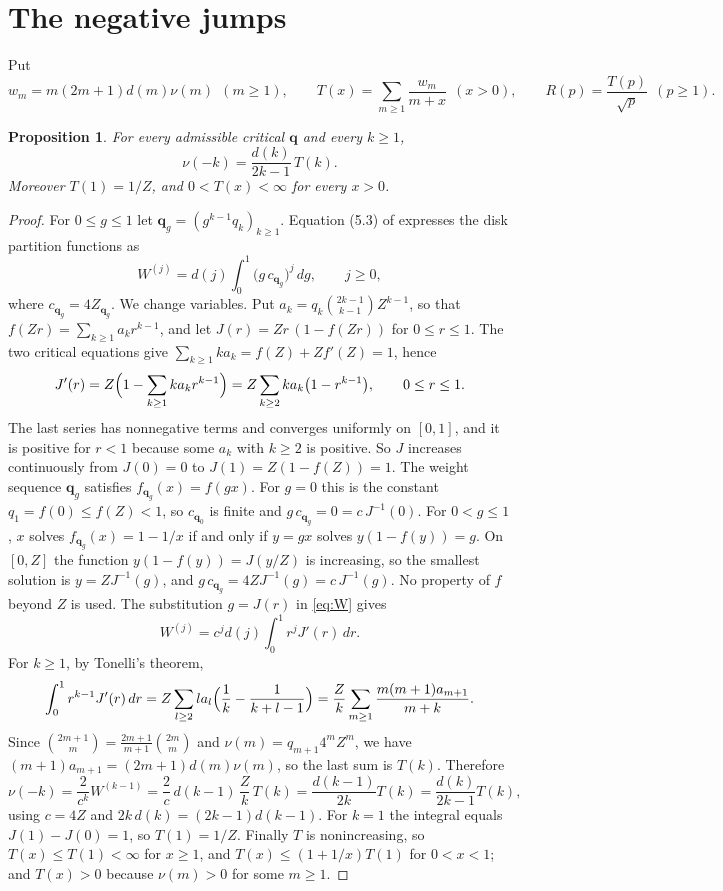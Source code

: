 \documentclass[11pt]{amsart}
\newtheorem{proposition}[theorem]{Proposition}
\theoremstyle{remark}
\numberwithin{equation}{section}
\newcommand{\1}{\mathbf 1}
\begin{document}
\section{The negative jumps}\label{sec:kernel}

Put
\[
w_m=m(2m+1)d(m)\nu(m)\ \ (m\ge1),\qquad T(x)=\sum_{m\ge1}\frac{w_m}{m+x}\ \ (x>0),\qquad R(p)=\frac{T(p)}{\sqrt p}\ \ (p\ge1).
\]

\begin{proposition}\label{prop:kernel}
For every admissible critical $\mathbf q$ and every $k\ge1$,
\[
\nu(-k)=\frac{d(k)}{2k-1}\,T(k).
\]
Moreover $T(1)=1/Z$, and $0<T(x)<\infty$ for every $x>0$.
\end{proposition}

\begin{proof}
For $0\le g\le1$ let $\mathbf q_g=(g^{k-1}q_k)_{k\ge1}$. Equation (5.3) of \cite{Cur} expresses the disk partition functions as
\begin{equation}\label{eq:W}
W^{(j)}=d(j)\int_0^1\bigl(g\,c_{\mathbf q_g}\bigr)^j\,dg,\qquad j\ge0,
\end{equation}
where $c_{\mathbf q_g}=4Z_{\mathbf q_g}$. We change variables. Put $a_k=q_k\binom{2k-1}{k-1}Z^{k-1}$, so that $f(Zr)=\sum_{k\ge1}a_kr^{k-1}$, and let $J(r)=Zr\,(1-f(Zr))$ for $0\le r\le1$. The two critical equations give $\sum_{k\ge1}ka_k=f(Z)+Zf'(Z)=1$, hence
\[
J'(r)=Z\Bigl(1-\sum_{k\ge1}ka_kr^{k-1}\Bigr)=Z\sum_{k\ge2}ka_k\bigl(1-r^{k-1}\bigr),\qquad0\le r\le1 .
\]
The last series has nonnegative terms and converges uniformly on $[0,1]$, and it is positive for $r<1$ because some $a_k$ with $k\ge2$ is positive. So $J$ increases continuously from $J(0)=0$ to $J(1)=Z(1-f(Z))=1$. The weight sequence $\mathbf q_g$ satisfies $f_{\mathbf q_g}(x)=f(gx)$. For $g=0$ this is the constant $q_1=f(0)\le f(Z)<1$, so $c_{\mathbf q_0}$ is finite and $g\,c_{\mathbf q_g}=0=c\,J^{-1}(0)$. For $0<g\le1$, $x$ solves $f_{\mathbf q_g}(x)=1-1/x$ if and only if $y=gx$ solves $y(1-f(y))=g$. On $[0,Z]$ the function $y(1-f(y))=J(y/Z)$ is increasing, so the smallest solution is $y=ZJ^{-1}(g)$, and $g\,c_{\mathbf q_g}=4ZJ^{-1}(g)=c\,J^{-1}(g)$. No property of $f$ beyond $Z$ is used. The substitution $g=J(r)$ in \eqref{eq:W} gives
\[
W^{(j)}=c^j d(j)\int_0^1r^jJ'(r)\,dr .
\]
For $k\ge1$, by Tonelli's theorem,
\[
\int_0^1r^{k-1}J'(r)\,dr=Z\sum_{l\ge2}la_l\Bigl(\frac1k-\frac1{k+l-1}\Bigr)=\frac Zk\sum_{m\ge1}\frac{m(m+1)a_{m+1}}{m+k}.
\]
Since $\binom{2m+1}{m}=\frac{2m+1}{m+1}\binom{2m}m$ and $\nu(m)=q_{m+1}4^mZ^m$, we have $(m+1)a_{m+1}=(2m+1)d(m)\nu(m)$, so the last sum is $T(k)$. Therefore
\[
\nu(-k)=\frac2{c^k}W^{(k-1)}=\frac2c\,d(k-1)\,\frac Zk\,T(k)=\frac{d(k-1)}{2k}T(k)=\frac{d(k)}{2k-1}T(k),
\]
using $c=4Z$ and $2k\,d(k)=(2k-1)d(k-1)$. For $k=1$ the integral equals $J(1)-J(0)=1$, so $T(1)=1/Z$. Finally $T$ is nonincreasing, so $T(x)\le T(1)<\infty$ for $x\ge1$, and $T(x)\le(1+1/x)T(1)$ for $0<x<1$; and $T(x)>0$ because $\nu(m)>0$ for some $m\ge1$.
\end{proof}
\end{document}
